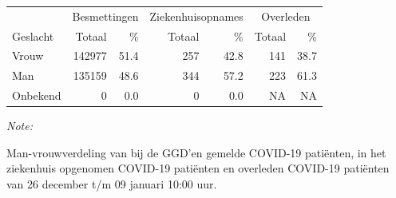 \documentclass[
  english,
  man,floatsintext]{apa6}
\begin{document}
\begin{table}
\centering\begingroup\fontsize{11}{13}\selectfont

\begin{threeparttable}
\begin{tabular}{lrrrrrr}
\toprule
\multicolumn{1}{c}{ } & \multicolumn{2}{c}{Besmettingen} & \multicolumn{2}{c}{Ziekenhuisopnames} & \multicolumn{2}{c}{Overleden} \\
\cmidrule(l{3pt}r{3pt}){2-3} \cmidrule(l{3pt}r{3pt}){4-5} \cmidrule(l{3pt}r{3pt}){6-7}
Geslacht & Totaal & \% & Totaal & \% & Totaal & \%\\
\midrule
Vrouw & 142977 & 51.4 & 257 & 42.8 & 141 & 38.7\\
Man & 135159 & 48.6 & 344 & 57.2 & 223 & 61.3\\
Onbekend & 0 & 0.0 & 0 & 0.0 & NA & NA\\
\bottomrule
\end{tabular}
\begin{tablenotes}
\item \textit{Note: } 
\item Man-vrouwverdeling van bij de GGD’en gemelde COVID-19 patiënten, in het ziekenhuis opgenomen COVID-19 patiënten en overleden COVID-19 patiënten van 26 december t/m 09 januari 10:00 uur.
\end{tablenotes}
\end{threeparttable}
\endgroup{}
\end{table}
\newpage
\end{document}
